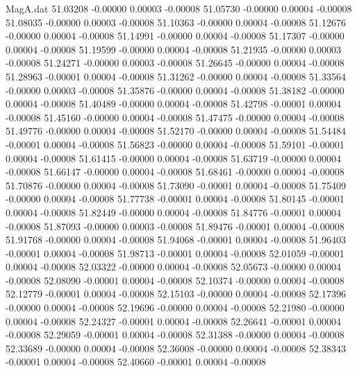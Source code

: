 \begin{filecontents}{MagA.dat}
  51.03208   -0.00000    0.00003   -0.00008
  51.05730   -0.00000    0.00004   -0.00008
  51.08035   -0.00000    0.00003   -0.00008
  51.10363   -0.00000    0.00004   -0.00008
  51.12676   -0.00000    0.00004   -0.00008
  51.14991   -0.00000    0.00004   -0.00008
  51.17307   -0.00000    0.00004   -0.00008
  51.19599   -0.00000    0.00004   -0.00008
  51.21935   -0.00000    0.00003   -0.00008
  51.24271   -0.00000    0.00003   -0.00008
  51.26645   -0.00000    0.00004   -0.00008
  51.28963   -0.00001    0.00004   -0.00008
  51.31262   -0.00000    0.00004   -0.00008
  51.33564   -0.00000    0.00003   -0.00008
  51.35876   -0.00000    0.00004   -0.00008
  51.38182   -0.00000    0.00004   -0.00008
  51.40489   -0.00000    0.00004   -0.00008
  51.42798   -0.00001    0.00004   -0.00008
  51.45160   -0.00000    0.00004   -0.00008
  51.47475   -0.00000    0.00004   -0.00008
  51.49776   -0.00000    0.00004   -0.00008
  51.52170   -0.00000    0.00004   -0.00008
  51.54484   -0.00001    0.00004   -0.00008
  51.56823   -0.00000    0.00004   -0.00008
  51.59101   -0.00001    0.00004   -0.00008
  51.61415   -0.00000    0.00004   -0.00008
  51.63719   -0.00000    0.00004   -0.00008
  51.66147   -0.00000    0.00004   -0.00008
  51.68461   -0.00000    0.00004   -0.00008
  51.70876   -0.00000    0.00004   -0.00008
  51.73090   -0.00001    0.00004   -0.00008
  51.75409   -0.00000    0.00004   -0.00008
  51.77738   -0.00001    0.00004   -0.00008
  51.80145   -0.00001    0.00004   -0.00008
  51.82449   -0.00000    0.00004   -0.00008
  51.84776   -0.00001    0.00004   -0.00008
  51.87093   -0.00000    0.00003   -0.00008
  51.89476   -0.00001    0.00004   -0.00008
  51.91768   -0.00000    0.00004   -0.00008
  51.94068   -0.00001    0.00004   -0.00008
  51.96403   -0.00001    0.00004   -0.00008
  51.98713   -0.00001    0.00004   -0.00008
  52.01059   -0.00001    0.00004   -0.00008
  52.03322   -0.00000    0.00004   -0.00008
  52.05673   -0.00000    0.00004   -0.00008
  52.08090   -0.00001    0.00004   -0.00008
  52.10374   -0.00000    0.00004   -0.00008
  52.12779   -0.00001    0.00004   -0.00008
  52.15103   -0.00000    0.00004   -0.00008
  52.17396   -0.00000    0.00004   -0.00008
  52.19696   -0.00000    0.00004   -0.00008
  52.21980   -0.00000    0.00004   -0.00008
  52.24327   -0.00001    0.00004   -0.00008
  52.26641   -0.00001    0.00004   -0.00008
  52.29059   -0.00001    0.00004   -0.00008
  52.31388   -0.00000    0.00004   -0.00008
  52.33689   -0.00000    0.00004   -0.00008
  52.36008   -0.00000    0.00004   -0.00008
  52.38343   -0.00001    0.00004   -0.00008
  52.40660   -0.00001    0.00004   -0.00008

\end{filecontents}
